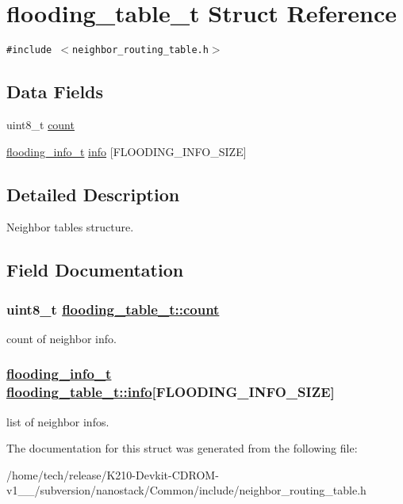 \hypertarget{structflooding__table__t}{
\section{flooding\_\-table\_\-t Struct Reference}
\label{structflooding__table__t}
}
{\tt \#include $<$neighbor\_\-routing\_\-table.h$>$}

\subsection*{Data Fields}
\begin{CompactItemize}
\item 
uint8\_\-t \hyperlink{structflooding__table__t_cb13efcc138f8c2ec9bfc7f79e404ec1}{count}
\item 
\hyperlink{structflooding__info__t}{flooding\_\-info\_\-t} \hyperlink{structflooding__table__t_19b31cdd8cfa635644fefbfc84881f91}{info} \mbox{[}FLOODING\_\-INFO\_\-SIZE\mbox{]}
\end{CompactItemize}


\subsection{Detailed Description}
Neighbor tables structure. 



\subsection{Field Documentation}
\hypertarget{structflooding__table__t_cb13efcc138f8c2ec9bfc7f79e404ec1}{
\subsubsection[count]{\setlength{\rightskip}{0pt plus 5cm}uint8\_\-t \hyperlink{structflooding__table__t_cb13efcc138f8c2ec9bfc7f79e404ec1}{flooding\_\-table\_\-t::count}}}
\label{structflooding__table__t_cb13efcc138f8c2ec9bfc7f79e404ec1}


count of neighbor info. \hypertarget{structflooding__table__t_19b31cdd8cfa635644fefbfc84881f91}{
\subsubsection[info]{\setlength{\rightskip}{0pt plus 5cm}\hyperlink{structflooding__info__t}{flooding\_\-info\_\-t} \hyperlink{structflooding__table__t_19b31cdd8cfa635644fefbfc84881f91}{flooding\_\-table\_\-t::info}\mbox{[}FLOODING\_\-INFO\_\-SIZE\mbox{]}}}
\label{structflooding__table__t_19b31cdd8cfa635644fefbfc84881f91}


list of neighbor infos. 

The documentation for this struct was generated from the following file:\begin{CompactItemize}
\item 
/home/tech/release/K210-Devkit-CDROM-v1\_\_/subversion/nanostack/Common/include/neighbor\_\-routing\_\-table.h\end{CompactItemize}
